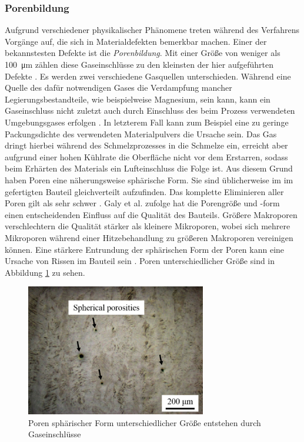 		\subsubsection{Porenbildung}
		Aufgrund verschiedener physikalischer Phänomene treten während des Verfahrens Vorgänge auf,
		die sich in Materialdefekten bemerkbar machen. Einer der bekannstesten Defekte ist die
		\emph{Porenbildung}. Mit einer Größe von weniger als \SI{100}{\micro\meter} zählen diese
		Gaseinschlüsse zu den kleinsten der hier aufgeführten Defekte \cite{zhang2017defect}. Es
		werden zwei verschiedene Gasquellen unterschieden. Während eine Quelle des dafür
		notwendigen Gases die Verdampfung mancher Legierungsbestandteile, wie beispielweise
		Magnesium, sein kann, kann ein Gaseinschluss nicht zuletzt auch durch Einschluss des beim
		Prozess verwendeten Umgebungsgases erfolgen \cite{galy2018main}. In letzterem Fall kann
		zum Beispiel eine zu geringe Packungsdichte des verwendeten Materialpulvers die Ursache
		sein. Das Gas dringt hierbei während des Schmelzprozesses in die Schmelze ein, erreicht
		aber aufgrund einer hohen Kühlrate die Oberfläche nicht vor dem Erstarren, sodass beim
		Erhärten des Materials ein Lufteinschluss die Folge ist. Aus diesem Grund haben Poren eine
		näherungsweise sphärische Form. Sie sind üblicherweise im im gefertigten Bauteil
		gleichverteilt aufzufinden. Das komplette Eliminieren aller Poren gilt als sehr schwer
		\cite{zhang2017defect}. Galy et al. zufolge hat die Porengröße und -form einen
		entscheidenden Einfluss auf die Qualität des Bauteils. Größere Makroporen verschlechtern
		die Qualität stärker als kleinere Mikroporen, wobei sich mehrere Mikroporen während einer
		Hitzebehandlung zu größeren Makroporen vereinigen können. Eine stärkere Entrundung der
		sphärischen Form der Poren kann eine Ursache von Rissen im Bauteil sein
		\cite{galy2018main}. Poren unterschiedlicher Größe sind in Abbildung
		\ref{fig:defects_porosities} zu sehen.

		\begin{figure}[ht]
			\centering
			\includegraphics[width=0.7\textwidth]{chapter/main/img/defects/porosities.png}
			\caption{Poren sphärischer Form unterschiedlicher Größe entstehen durch Gaseinschlüsse
			\cite{zhang2017defect}}
			\label{fig:defects_porosities}
		\end{figure}

